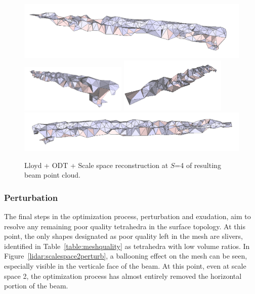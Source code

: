 \documentclass[12pt]{drexelthesis}
\let\Oldsubsubsection\subsubsection
\renewcommand{\subsubsection}{\FloatBarrier\Oldsubsubsection}
\begin{document}
\begin{figure}[!ht]
	\centering
		\includegraphics[width=5in]{real-lab-scans/optimizedNeat/scalespace4odt00.png}
		\includegraphics[width=2in]{real-lab-scans/optimizedNeat/scalespace4odt01.png}
		\includegraphics[width=2in]{real-lab-scans/optimizedNeat/scalespace4odt02.png}
		\includegraphics[width=5in]{real-lab-scans/optimizedNeat/scalespace4odt03.png}
		\caption[Lloyd + ODT + Scale space reconstruction at $S$=4 of segmented LiDAR data]{\centering Lloyd + ODT + Scale space reconstruction at $S$=4 of resulting beam point cloud.}
	\label{lidar:scalespace4odt}
\end{figure}

\subsubsection{Perturbation}

The final steps in the optimization process, perturbation and exudation, aim to resolve any remaining poor quality tetrahedra in the surface topology. At this point, the only shapes designated as poor quality left in the mesh are slivers, identified in Table~\ref{table:meshquality} as tetrahedra with low volume ratios. In Figure~\ref{lidar:scalespace2perturb}, a ballooning effect on the mesh can be seen, especially visible in the verticale face of the beam. At this point, even at scale space 2, the optimization process has almost entirely removed the horizontal portion of the beam.
\end{document}
